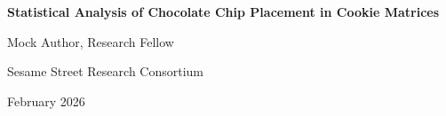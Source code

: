 \documentclass[11pt,letterpaper]{article}
\begin{document}
\begin{center}
{\LARGE\bfseries Statistical Analysis of Chocolate Chip Placement in Cookie Matrices\par}
\vspace{0.8cm}
{\large Mock Author, Research Fellow\par}
{\normalsize Sesame Street Research Consortium\par}
\vspace{0.3cm}
{\normalsize February 2026\par}
\vspace{0.8cm}
\end{center}

\begin{abstract}
\noindent
This paper presents a comprehensive study of chocolate chip spatial distribution and statistical patterns. Lorem cookie ipsum dolor sit amet, chocolate chip adipiscing elit. Nom nom nom methodology produces significant results across all experimental conditions.
\end{abstract}

\vspace{0.5cm}


\end{document}
